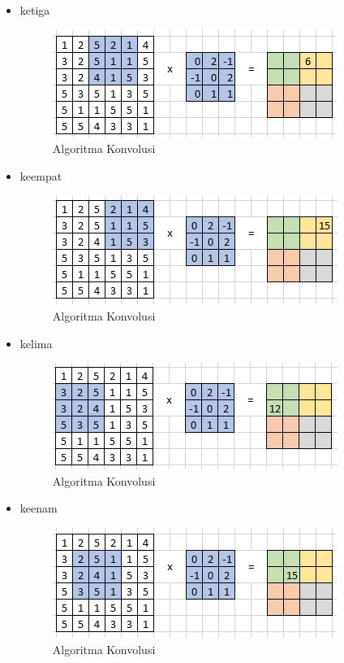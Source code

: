 \begin{itemize}
\begin{itemize}
		\item ketiga
			\begin{figure}[H]
				\centering
				\includegraphics[scale=1]{figures/1174083/figures7/13.png}
				\caption{Algoritma Konvolusi}
			\end{figure}
			
		\item keempat
			\begin{figure}[H]
				\centering
				\includegraphics[scale=1]{figures/1174083/figures7/14.png}
				\caption{Algoritma Konvolusi}
			\end{figure}
			
		\item kelima
			\begin{figure}[H]
				\centering
				\includegraphics[scale=1]{figures/1174083/figures7/15.png}
				\caption{Algoritma Konvolusi}
			\end{figure}
			
		\item keenam
			\begin{figure}[H]
				\centering
				\includegraphics[scale=1]{figures/1174083/figures7/16.png}
				\caption{Algoritma Konvolusi}
			\end{figure}
			

\end{itemize}
\end{itemize}
